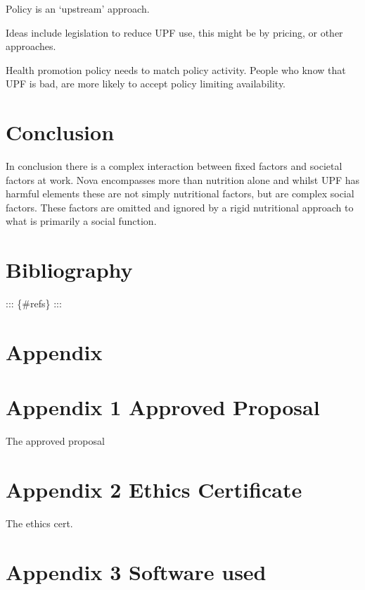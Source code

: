 \documentclass[
]{article}
\begin{document}
Policy is an `upstream' approach.

Ideas include legislation to reduce UPF use, this might be by pricing,
or other approaches.

Health promotion policy needs to match policy activity. People who know
that UPF is bad, are more likely to accept policy limiting availability.

\newpage

\hypertarget{conclusion}{%
\section{Conclusion}\label{conclusion}}

In conclusion there is a complex interaction between fixed factors and
societal factors at work. Nova encompasses more than nutrition alone and
whilst UPF has harmful elements these are not simply nutritional
factors, but are complex social factors. These factors are omitted and
ignored by a rigid nutritional approach to what is primarily a social
function. \newpage

\hypertarget{bibliography}{%
\section{Bibliography}\label{bibliography}}

::: \{\#refs\} :::

\hypertarget{appendix}{%
\section*{Appendix}\label{appendix}}

\hypertarget{appendix-1-approved-proposal}{%
\section{Appendix 1 Approved
Proposal}\label{appendix-1-approved-proposal}}

The approved proposal

\hypertarget{appendix-2-ethics-certificate}{%
\section{Appendix 2 Ethics
Certificate}\label{appendix-2-ethics-certificate}}

The ethics cert.

\hypertarget{appendix-3-software-used}{%
\section{Appendix 3 Software used}\label{appendix-3-software-used}}
\end{document}

